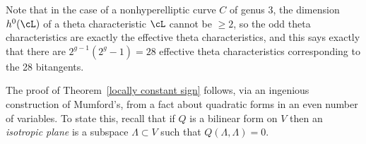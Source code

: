 
Note that in the case of a nonhyperelliptic curve $C$ of genus 3, the dimension $h^0(\cL)$ of a theta characteristic $\cL$ cannot be $\geq 2$, so
the odd theta characteristics are exactly the effective theta characteristics, and  this says exactly that there are $2^{g-1}(2^g-1) = 28$ effective theta characteristics corresponding to the 28 bitangents.

The proof of Theorem~\ref{locally constant sign} follows, via an ingenious construction of Mumford's, from a  fact about quadratic forms in an even number of variables.
To state this, recall that if $Q$ is a  bilinear form on $V$ then an \emph{isotropic plane} is a subspace $\Lambda \subset V$ such that $Q(\Lambda, \Lambda) = 0$. 

